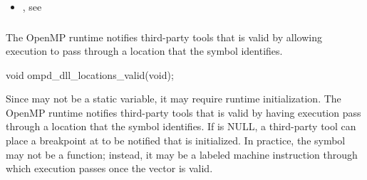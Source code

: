 \crossreferences
\begin{itemize}
\item   {}, 
see 
\end{itemize}



\subsubsection{}
\label{subsubsec:ompd_dll_locations_valid}

\summary
The OpenMP runtime notifies third-party tools that 
is valid by allowing execution to pass through a location that the symbol 
 identifies.

\format
\begin{cspecific}
\begin{ompSyntax}
void ompd_dll_locations_valid(void);
\end{ompSyntax}
\end{cspecific}

\descr
Since  may not be a static variable, it may require
runtime initialization. The OpenMP runtime notifies third-party tools that 
 is valid by having execution pass through a location 
that the symbol  identifies. If 
 is NULL, a third-party tool can place a breakpoint 
at  to be notified that  
is initialized. In practice, the symbol  
may not be a function; instead, it may be a labeled machine instruction through
which execution passes once the vector is valid.
